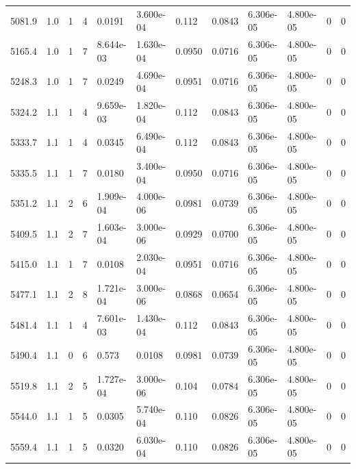\documentclass[preview]{standalone}
\begin{document}
{{{\begin{tabular}{L{1.2cm}C{1.2cm} C{0.3cm}C{0.5cm} C{1.4cm}C{1.4cm} C{1.4cm}C{1.4cm} C{1.6cm}C{1.6cm} C{1.6cm}C{1.6cm}}
  5081.9  &   1.0  & 1     &  4 &  0.0191  & 3.600e-04  &  0.112&   0.0843& 6.306e-05 & 4.800e-05   &  0 & 0  \\ 
  5165.4  &   1.0  & 1     &  7 &  8.644e-03  & 1.630e-04  &  0.0950&   0.0716& 6.306e-05 & 4.800e-05   &  0 & 0  \\ 
  5248.3  &   1.0  & 1     &  7 &  0.0249  & 4.690e-04  &  0.0951&   0.0716& 6.306e-05 & 4.800e-05   &  0 & 0  \\ 
  5324.2  &   1.1  & 1     &  4 &  9.659e-03  & 1.820e-04  &  0.112&   0.0843& 6.306e-05 & 4.800e-05   &  0 & 0  \\ 
  5333.7  &   1.1  & 1     &  4 &  0.0345  & 6.490e-04  &  0.112&   0.0843& 6.306e-05 & 4.800e-05   &  0 & 0  \\ 
  5335.5  &   1.1  & 1     &  7 &  0.0180  & 3.400e-04  &  0.0950&   0.0716& 6.306e-05 & 4.800e-05   &  0 & 0  \\ 
  5351.2  &   1.1  & 2     &  6 &  1.909e-04  & 4.000e-06  &  0.0981&   0.0739& 6.306e-05 & 4.800e-05   &  0 & 0  \\ 
  5409.5  &   1.1  & 2     &  7 &  1.603e-04  & 3.000e-06  &  0.0929&   0.0700& 6.306e-05 & 4.800e-05   &  0 & 0  \\ 
  5415.0  &   1.1  & 1     &  7 &  0.0108  & 2.030e-04  &  0.0951&   0.0716& 6.306e-05 & 4.800e-05   &  0 & 0  \\ 
  5477.1  &   1.1  & 2     &  8 &  1.721e-04  & 3.000e-06  &  0.0868&   0.0654& 6.306e-05 & 4.800e-05   &  0 & 0  \\ 
  5481.4  &   1.1  & 1     &  4 &  7.601e-03  & 1.430e-04  &  0.112&   0.0843& 6.306e-05 & 4.800e-05   &  0 & 0  \\ 
  5490.4  &   1.1  & 0     &  6 &  0.573  & 0.0108  &  0.0981&   0.0739& 6.306e-05 & 4.800e-05   &  0 & 0  \\ 
  5519.8  &   1.1  & 2     &  5 &  1.727e-04  & 3.000e-06  &  0.104&   0.0784& 6.306e-05 & 4.800e-05   &  0 & 0  \\ 
  5544.0  &   1.1  & 1     &  5 &  0.0305  & 5.740e-04  &  0.110&   0.0826& 6.306e-05 & 4.800e-05   &  0 & 0  \\ 
  5559.4  &   1.1  & 1     &  5 &  0.0320  & 6.030e-04  &  0.110&   0.0826& 6.306e-05 & 4.800e-05   &  0 & 0  \\ 
\hline 
\end{tabular} 

}}}
\end{document}
